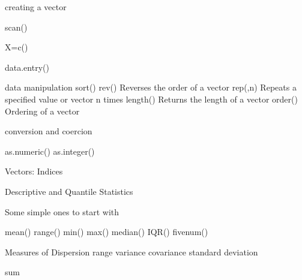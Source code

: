 creating a vector

scan()

X=c()

data.entry()

data manipulation
sort()
rev()    	Reverses the order of a vector
rep(,n)    Repeats a specified value or vector n times
length()   Returns the length of a vector
order()   Ordering of a vector

 
conversion and coercion

as.numeric()
as.integer()


Vectors: Indices

 

 


Descriptive and Quantile Statistics


Some simple ones to start with

mean()
range()
min()
max()
median()
IQR()
fivenum()


Measures of Dispersion
  range
  variance
  covariance
  standard deviation

sum
